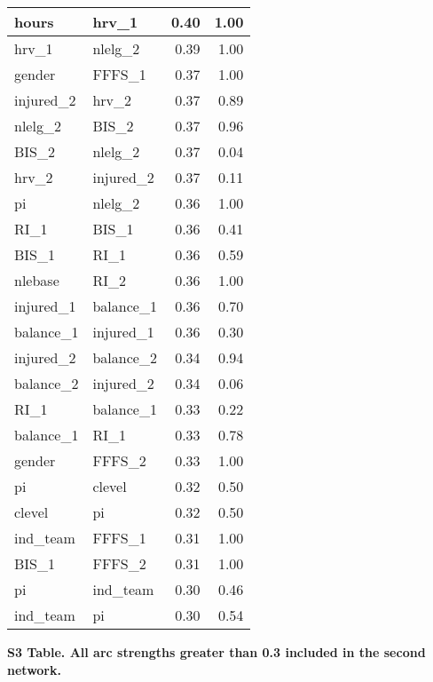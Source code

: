 \documentclass[
]{article}
\begin{document}
\begin{longtable}[t]{l|l|r|r}
\hline
hours & hrv\_1 & 0.40 & 1.00\\
\hline
hrv\_1 & nlelg\_2 & 0.39 & 1.00\\
\hline
gender & FFFS\_1 & 0.37 & 1.00\\
\hline
injured\_2 & hrv\_2 & 0.37 & 0.89\\
\hline
nlelg\_2 & BIS\_2 & 0.37 & 0.96\\
\hline
BIS\_2 & nlelg\_2 & 0.37 & 0.04\\
\hline
hrv\_2 & injured\_2 & 0.37 & 0.11\\
\hline
pi & nlelg\_2 & 0.36 & 1.00\\
\hline
RI\_1 & BIS\_1 & 0.36 & 0.41\\
\hline
BIS\_1 & RI\_1 & 0.36 & 0.59\\
\hline
nlebase & RI\_2 & 0.36 & 1.00\\
\hline
injured\_1 & balance\_1 & 0.36 & 0.70\\
\hline
balance\_1 & injured\_1 & 0.36 & 0.30\\
\hline
injured\_2 & balance\_2 & 0.34 & 0.94\\
\hline
balance\_2 & injured\_2 & 0.34 & 0.06\\
\hline
RI\_1 & balance\_1 & 0.33 & 0.22\\
\hline
balance\_1 & RI\_1 & 0.33 & 0.78\\
\hline
gender & FFFS\_2 & 0.33 & 1.00\\
\hline
pi & clevel & 0.32 & 0.50\\
\hline
clevel & pi & 0.32 & 0.50\\
\hline
ind\_team & FFFS\_1 & 0.31 & 1.00\\
\hline
BIS\_1 & FFFS\_2 & 0.31 & 1.00\\
\hline
pi & ind\_team & 0.30 & 0.46\\
\hline
ind\_team & pi & 0.30 & 0.54\\
\hline
\end{longtable}

\clearpage
\newpage

\textbf{S3 Table. All arc strengths greater than 0.3 included in the second network.}
\end{document}
